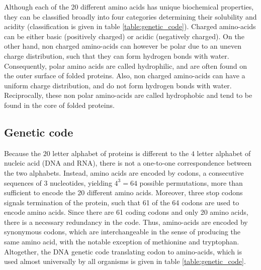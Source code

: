Although each of the 20 different amino acids has unique biochemical properties, they can be classified broadly into four categories determining their solubility and acidity (classification is given in table \ref{table:genetic_code}).
Charged amino-acids can be either basic (positively charged) or acidic (negatively charged).
On the other hand, non charged amino-acids can however be polar due to an uneven charge distribution, such that they can form hydrogen bonds with water.
Consequently, polar amino acids are called hydrophilic, and are often found on the outer surface of folded proteins.
Also, non charged amino-acids can have a uniform charge distribution, and do not form hydrogen bonds with water.
Reciprocally, these non polar amino-acids are called hydrophobic and tend to be found in the core of folded proteins.

\subsection{Genetic code}

Because the $20$ letter alphabet of proteins is different to the $4$ letter alphabet of nucleic acid (DNA and RNA), there is not a one-to-one correspondence between the two alphabets.
Instead, amino acids are encoded by \glspl{codon}, a consecutive sequences of 3 nucleotides, yielding $4^3=64$ possible permutations, more than sufficient to encode the 20 different amino acids.
Moreover, three stop \glspl{codon} signals termination of the protein, such that 61 of the 64 \glspl{codon} are used to encode amino acids.
Since there are 61 coding \glspl{codon} and only 20 amino acids, there is a necessary redundancy in the code.
Thus, amino-acids are encoded by synonymous \glspl{codon}, which are interchangeable in the sense of producing the same amino acid, with the notable exception of methionine and tryptophan.
Altogether, the \acrshort{DNA} genetic code translating \gls{codon} to amino-acids, which is used almost universally by all organisms is given in table \ref{table:genetic_code}.

